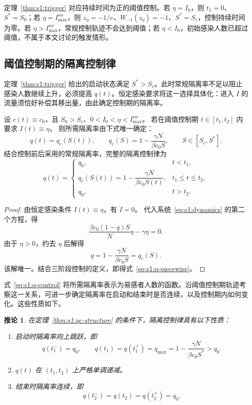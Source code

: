 \documentclass[lang=cn,a4paper,newtx]{elegantpaper}
\numberwithin{equation}{section}
\theoremstyle{plain}
\newtheorem{corollaryn}[theorem]{推论}
\begin{document}
\begin{remark}
定理~\ref{thm:s1:trigger} 对应持续时间为正的阈值控制。若 $\eta=I_0$，则 $t_1=0$、$S^*=S_0$；若 $\eta=I_{\max}^{no}$，则 $z_\eta=-1/e$、$W_{-1}(z_\eta)=-1$、$S^*=S_c$，控制持续时间为零。若 $\eta>I_{\max}^{no}$，常规控制轨迹不会达到阈值；若 $\eta<I_0$，初始感染人数已超过阈值，不属于本文讨论的触发情形。
\end{remark}

\subsection{阈值控制期的隔离控制律}
定理~\ref{thm:s1:trigger} 给出的启动状态满足 $S^*>S_c$。此时常规隔离率不足以阻止感染人数继续上升，必须提高 $q(t)$。恒定感染要求将这一选择具体化：进入 $I$ 的流量须恰好补偿其移出量，由此确定控制期的隔离率。

\begin{theorem}
\label{thm:s1:qc-structure}
设 $c(t)\equiv c_0$，且 $S_0>S_c$、$0<I_0<\eta<I_{\max}^{no}$。
若在阈值控制期 $t\in[t_1,t_2]$ 内要求 $I(t)\equiv\eta$，
则所需隔离率由下式唯一确定：
\begin{equation}
q(t)=q_c(S(t)),\qquad
q_c(S)=1-\frac{\gamma N}{\beta c_0S},\qquad S\in[S_c,S^*].
\label{eq:s1:q-control}
\end{equation}
结合控制前后采用的常规隔离率，完整的隔离控制律为
\begin{equation}
q(t)=
\begin{cases}
q_0, & t<t_1,\\[0.35em]
q_c(S(t))=1-\dfrac{\gamma N}{\beta c_0S(t)}, & t_1\le t\le t_2,\\[0.7em]
q_0, & t>t_2.
\end{cases}
\label{eq:s1:q-piecewise}
\end{equation}
\end{theorem}

\begin{proof}
由恒定感染条件 $I(t)\equiv\eta$，有 $\dot I=0$。
代入系统~\eqref{eq:s1:dynamics} 的第二个方程，得
\[
\frac{\beta c_0(1-q)S}{N}\eta-\gamma\eta=0.
\]
由于 $\eta>0$，约去 $\eta$ 后解得
\[
q=1-\frac{\gamma N}{\beta c_0S}=q_c(S).
\]
该解唯一。结合三阶段控制的定义，即得式~\eqref{eq:s1:q-piecewise}。
\end{proof}

式~\eqref{eq:s1:q-control} 将所需隔离率表示为易感者人数的函数。沿阈值控制期轨迹考察这一关系，可进一步确定隔离率在启动和结束时是否连续，以及控制期内如何变化。这些性质如下。

\begin{corollaryn}
\label{cor:s1:qc-structure}
在定理~\ref{thm:s1:qc-structure} 的条件下，隔离控制律具有以下性质：
\begin{enumerate}
\renewcommand{\labelenumi}{(\roman{enumi})}
    \item 启动时隔离率向上跳跃，即
    \[
    q(t_1^-)=q_0,\qquad
    q(t_1)=q(t_1^+)=q_{\max}
    =1-\frac{\gamma N}{\beta c_0S^*}>q_0.
    \]
    \item $q(t)$ 在 $(t_1,t_2)$ 上严格单调递减。
    \item 结束时隔离率连续，即
    \[
    q(t_2^-)=q(t_2)=q(t_2^+)=q_0.
    \]
\end{enumerate}
\end{corollaryn}
\end{document}
